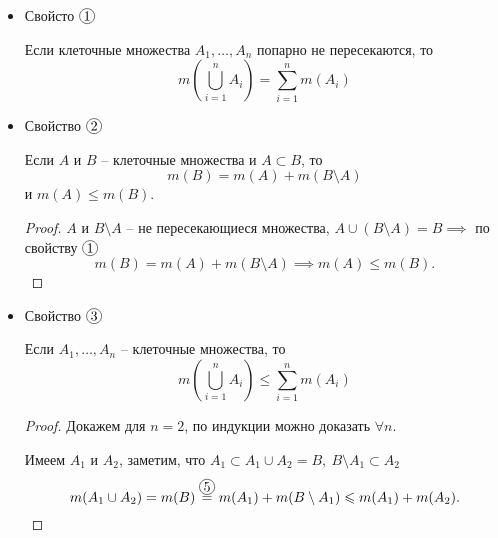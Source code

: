 \begin{itemize}
    \item Свойсто $ \circled{1} $
          \begin{statement}
              Если клеточные множества $ A_1,\ldots,A_n $ попарно не пересекаются, то
              \begin{equation}\label{eq:8.1.4}
                  m(\overset{n}{\underset{i=1}{\bigcup}}A_i) = \sum_{i=1}^{n}m(A_i)
              \end{equation}
          \end{statement}

    \item Свойство $ \circled{2} $
          \begin{statement}
              Если $ A $ и $ B $ -- клеточные множества и $ A \subset B $, то
              \begin{equation}\label{eq:8.1.5}
                  m(B) = m(A) + m(B \setminus A)
              \end{equation}
              и $ m(A) \leqslant m(B) $.
          \end{statement}
          \begin{proof}
              $ A $ и $ B \setminus A $ -- не пересекающиеся множества, $ A \cup (B \setminus A) = B \implies $ по свойству $ \circled{1} $
              \[
                  m(B) = m(A) + m(B\setminus A) \implies m(A) \leqslant m(B).
              \]
          \end{proof}

    \item Свойство $ \circled{3} $
          \begin{statement}
              Если $ A_1,\ldots,A_n $ -- клеточные множества, то
              \begin{equation}\label{eq:8.1.6}
                  m(\overset{n}{\underset{i=1}{\bigcup}}A_i) \leqslant \sum_{i=1}^{n}m(A_i)
              \end{equation}
          \end{statement}
          \begin{proof}
              Докажем для $ n=2 $, по индукции можно доказать $ \forall n $.

              Имеем $ A_1 $ и $ A_2 $, заметим, что $ A_1 \subset A_1 \cup A_2 = B, \ B \setminus A_1 \subset A_2 $
              \[
                  m(A_1 \cup A_2) = m(B) \overset{\circled{5}}{=} m(A_1) + m(B\setminus A_1) \leqslant m(A_1) + m(A_2).
              \]
          \end{proof}


\end{itemize}
